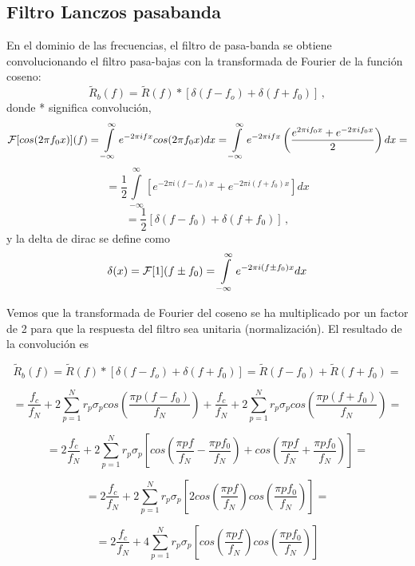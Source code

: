 \documentclass[
]{agujournal2019}
\begin{document}
\hypertarget{filtro-lanczos-pasabanda}{%
\subsection{Filtro Lanczos pasabanda}\label{filtro-lanczos-pasabanda}}

En el dominio de las frecuencias, el filtro de pasa-banda se obtiene
convolucionando el filtro pasa-bajas con la transformada de Fourier de
la función coseno:
\[\widetilde{R}_b(f)=\widetilde{R}(f)*\left[\delta(f-f_o) + \delta(f+f_0) \right]\,,\]
donde * significa convolución,
\[{\cal F}[cos(2\pi f_0 x)](f)=\int\limits^{\infty}_{-\infty} e^{-2\pi i f x} cos(2\pi
f_0 x) dx=\int\limits^{\infty}_{-\infty} e^{-2\pi i f x}
\left(\frac{e^{2\pi i f_0 x} +e^{-2\pi i f_0 x}}{2}\right) dx = \]
\[=\frac{1}{2}\int\limits^{\infty}_{-\infty}\left[e^{-2\pi i (f-f_0) x} + e^{-2\pi i (f+f_0) x} \right] dx\]
\[=\frac{1}{2}\left[ \delta(f-f_0) + \delta(f+f_0)\right]\,,\] y la
delta de dirac se define como
\[\delta(x)={\cal F}[1](f\pm f_0)=\int\limits^{\infty}_{-\infty} e^{-2\pi i (f\pm f_0) x} dx\]

Vemos que la transformada de Fourier del coseno se ha multiplicado por
un factor de 2 para que la respuesta del filtro sea unitaria
(normalización). El resultado de la convolución es

\[\widetilde{R}_b(f)=\widetilde{R}(f)*\left[\delta(f-f_o) + \delta(f+f_0) \right]=
\widetilde{R}(f-f_0)+\widetilde{R}(f+f_0)=\]

\[=\frac{f_c}{f_N}+ 2\sum\limits^{N}_{p=1}
{r_p} \sigma_p cos\left( \frac{\pi p (f-f_0)}{f_N}\right) +
\frac{f_c}{f_N}+ 2\sum\limits^{N}_{p=1}
{r_p} \sigma_p cos\left( \frac{\pi p (f+f_0)}{f_N}\right)=\]

\[=2\frac{f_c}{f_N}+ 2\sum\limits^{N}_{p=1}
{r_p} \sigma_p \left[ cos\left( \frac{\pi p f}{f_N} - \frac{\pi p f_0}{f_N}\right) +
cos\left( \frac{\pi p f}{f_N} + \frac{\pi p f_0}{f_N}\right)\right]=\]

\[=2\frac{f_c}{f_N}+ 2\sum\limits^{N}_{p=1} r_p \sigma_p\left[
2cos\left( \frac{\pi p f}{f_N}\right) cos\left( \frac{\pi p f_0}{f_N}\right)\right]=\]

\[=2\frac{f_c}{f_N}+ 4\sum\limits^{N}_{p=1} r_p \sigma_p\left[
cos\left( \frac{\pi p f}{f_N}\right) cos\left( \frac{\pi p f_0}{f_N}\right)\right]\]

\begin{center}
\end{center}
\end{document}
